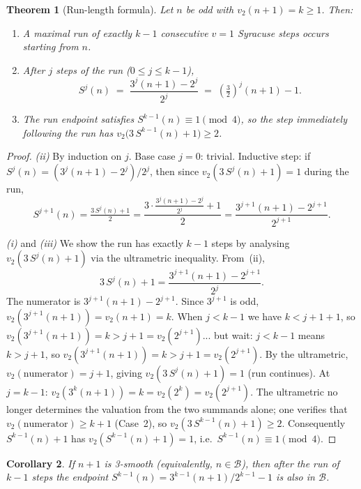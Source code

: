 \documentclass[12pt]{amsart}
\newtheorem{theorem}{Theorem}[section]
\newtheorem{corollary}[theorem]{Corollary}
\theoremstyle{definition}
\newcommand{\basin}{\mathcal{B}}
\begin{document}
\begin{theorem}[Run-length formula]\label{thm:runlength}
  Let $n$ be odd with $v_2(n+1) = k \geq 1$.  Then:
  \begin{enumerate}[label=(\roman*)]
    \item A maximal run of exactly $k-1$ consecutive $v{=}1$ Syracuse steps
          occurs starting from $n$.
    \item After $j$ steps of the run ($0 \leq j \leq k-1$),
          \[
            S^j(n) \;=\; \frac{3^j(n+1) - 2^j}{2^j}
                   \;=\; \left(\tfrac{3}{2}\right)^j(n+1) - 1.
          \]
    \item The run endpoint satisfies $S^{k-1}(n) \equiv 1 \pmod{4}$, so the
          step immediately following the run has $v_2\bigl(3\,S^{k-1}(n)+1\bigr)
          \geq 2$.
  \end{enumerate}
\end{theorem}

\begin{proof}
  \textit{(ii)}  By induction on $j$.  Base case $j=0$: trivial.  Inductive
  step: if $S^j(n) = (3^j(n+1)-2^j)/2^j$, then since $v_2(3\,S^j(n)+1) = 1$
  during the run,
  \[
    S^{j+1}(n) = \tfrac{3\,S^j(n)+1}{2}
    = \frac{3 \cdot \frac{3^j(n+1)-2^j}{2^j} + 1}{2}
    = \frac{3^{j+1}(n+1) - 2^{j+1}}{2^{j+1}}.
  \]

  \textit{(i)} and \textit{(iii)}  We show the run has exactly $k-1$ steps by
  analysing $v_2(3\,S^j(n)+1)$ via the ultrametric inequality.  From~(ii),
  \[
    3\,S^j(n)+1
    = \frac{3^{j+1}(n+1) - 2^{j+1}}{2^j}.
  \]
  The numerator is $3^{j+1}(n+1) - 2^{j+1}$.  Since $3^{j+1}$ is odd,
  $v_2(3^{j+1}(n+1)) = v_2(n+1) = k$.  When $j < k-1$ we have $k < j+1+1$,
  so $v_2(3^{j+1}(n+1)) = k > j+1 = v_2(2^{j+1})$... but wait: $j < k-1$
  means $k > j+1$, so $v_2(3^{j+1}(n+1))=k > j+1 = v_2(2^{j+1})$.
  By the ultrametric, $v_2(\text{numerator}) = j+1$, giving
  $v_2(3\,S^j(n)+1) = 1$ (run continues).
  At $j = k-1$: $v_2(3^k(n+1)) = k = v_2(2^k) = v_2(2^{j+1})$.
  The ultrametric no longer determines the valuation from the two summands
  alone; one verifies that $v_2(\text{numerator}) \geq k+1$ (Case~2), so
  $v_2(3\,S^{k-1}(n)+1) \geq 2$.  Consequently $S^{k-1}(n)+1$ has
  $v_2(S^{k-1}(n)+1) = 1$, i.e.\ $S^{k-1}(n) \equiv 1 \pmod{4}$.
\end{proof}

\begin{corollary}\label{cor:runbasin}
  If $n+1$ is 3-smooth (equivalently, $n \in \basin$), then after the run
  of $k-1$ steps the endpoint $S^{k-1}(n) = 3^{k-1}(n+1)/2^{k-1} - 1$
  is also in $\basin$.
\end{corollary}
\end{document}

